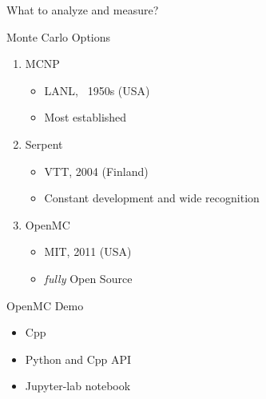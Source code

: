 \documentclass[sans,mathserif,aspectratio=169, 10pt]{beamer}
\begin{document}
\begin{frame}{What to analyze and measure?}
\centering
{}
\end{frame}

\begin{frame}{Monte Carlo Options}
\begin{enumerate}[<+->]
\item MCNP
	\begin{itemize}[<+->]
	\item LANL, ~1950s (USA)
	\item Most established
	\end{itemize}
\item Serpent 
	\begin{itemize}[<+->]
	\item VTT, 2004 (Finland)
	\item Constant development and wide recognition 
	\end{itemize}
\item OpenMC
	\begin{itemize}[<+->]
	\item MIT, 2011 (USA)
	\item \emph{fully} Open Source
	\end{itemize}
\end{enumerate}
\end{frame}

\begin{frame}{OpenMC Demo}
\begin{itemize}
\item Cpp
\item Python and Cpp API
\item Jupyter-lab notebook 
\end{itemize}
\end{frame}
\end{document}
